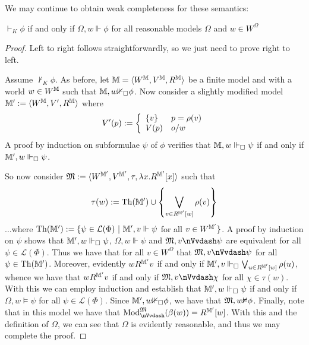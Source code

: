 We may continue to obtain weak completeness for these semantics:

\begin{proposition}
  $\vdash_K \phi$ if and only if $\Omega, w \Vdash \phi$ for all reasonable
  models $\Omega$ and $w \in W^{\Omega}$
\end{proposition}

\begin{proof}
  Left to right follows straightforwardly, so we just need to prove right to
  left.
  
  Assume $\nvdash_K \phi$. As before, let $\mathbbm{M} = \langle
  W^{\mathbbm{M}}, V^{\mathbbm{M}}, R^{\mathbbm{M}} \rangle$ be a finite model
  and with a world $w \in W^{\mathbbm{M}}$ such that $\mathbbm{M}, w
  {\nVdash}_{\Box} \phi$.   Now consider a slightly modified model
  $\mathbbm{M}' \assign \langle W^{\mathbbm{M}}, V', R^{\mathbbm{M}} \rangle$
  where
  \[ V' (p) \assign \left\{ \begin{array}{ll}
       \{v\} & p = \rho (v)\\
       V (p) & o / w
     \end{array} \right.  \]
  A proof by induction on subformulae $\psi$ of $\phi$ verifies that
  $\mathbbm{M}, w \Vdash_{\Box} \psi$ if and only if $\mathbbm{M}', w
  \Vdash_{\Box} \psi$.
  
  So now consider $\Omega \assign \langle W^{\mathbbm{M}'}, V^{\mathbbm{M}'},
  \tau, \lambda x.R^{\mathbbm{M}'} [x] \rangle$ such that
  \[ \tau (w) \assign \tmop{Th} (\mathbbm{M}') \cup \left\{ \bigvee_{v \in
     R^{\mathbbm{M}'} [w]} \rho (v) \right\} \]
  $\ldots$where $\tmop{Th} (\mathbbm{M}') \assign \{\psi \in \mathcal{L}
  (\Phi) \  | \  \mathbbm{M}', v \Vdash \psi$ for all $v
  \in W^{\mathbbm{M}'} \}$.   A proof by induction on $\psi$ shows that
  $\mathbbm{M}', w \Vdash_{\Box} \psi$, $\Omega, w \Vdash \psi$ and $\Omega, v
  {\nVvdash} \psi$ are equivalent for all $\psi \in \mathcal{L} (\Phi)$.  
  Thus we have that for all $v \in W^{\Omega}$ that $\Omega, v {\nVvdash}
  \psi$ for all $\psi \in \tmop{Th} (\mathbbm{M}')$.   Moreover, evidently $w
  R^{\mathbbm{M}'} v$ if and only if $\mathbbm{M}', v \Vdash_{\Box} \bigvee_{u
  \in R^{\mathbbm{M}'} [w]} \rho (u)$, whence we have that $w R^{\mathbbm{M}'}
  v$ if and only if $\Omega, v {\nVvdash} \chi$ for all $\chi \in \tau
  (w)$. With this we can employ induction and establish that $\mathbbm{M}', w
  \Vdash_{\Box} \psi$ if and only if $\Omega, w \models \psi$ for all $\psi
  \in \mathcal{L} (\Phi)$.   Since $\mathbbm{M}', w {\nVdash}_{\Box} \phi$,
  we have that $\Omega, w {\nmodels} \phi$.   Finally, note that in this
  model we have that $\tmop{Mod}^{\Omega}_{{\nVvdash}} (\beta (w)) =
  R^{\mathbbm{M}'} [w]$. With this and the definition of $\Omega$, we can see
  that $\Omega$ is evidently reasonable, and thus we may complete the proof.

\end{proof}

